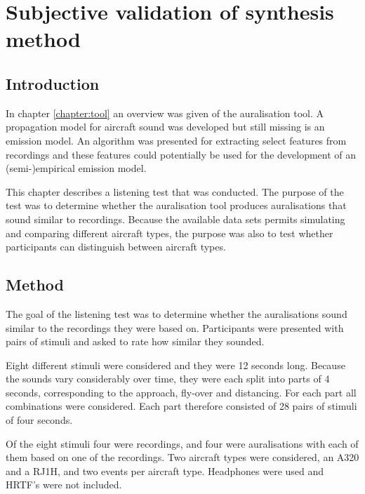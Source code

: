 \chapter{Subjective validation of synthesis method}\label{chapter:test}

\section{Introduction}
In chapter \ref{chapter:tool} an overview was given of the auralisation tool. A
propagation model for aircraft sound was developed but still missing is an
emission model. An algorithm was presented for extracting select features from
recordings and these features could potentially be used for the development of
an (semi-)empirical emission model.

This chapter describes a listening test that was conducted. The purpose of the
test was to determine whether the auralisation tool produces auralisations that
sound similar to recordings. Because the available data sets permits simulating
and comparing different aircraft types, the purpose was also to test whether
participants can distinguish between aircraft types.

\section{Method}

The goal of the listening test was to determine whether the auralisations sound
similar to the recordings they were based on. Participants were presented with
pairs of stimuli and asked to rate how similar they sounded.


Eight different stimuli were considered and they were 12 seconds long.
Because the sounds vary considerably over time, they were each split into parts
of 4 seconds, corresponding to the approach, fly-over and distancing. For each
part all combinations were considered. Each part therefore consisted of 28 pairs
of stimuli of four seconds.

Of the eight stimuli four were recordings, and four were auralisations with each
of them based on one of the recordings. Two aircraft types were considered, an
A320 and a RJ1H, and two events per aircraft type.
Headphones were used and HRTF's were not included.

